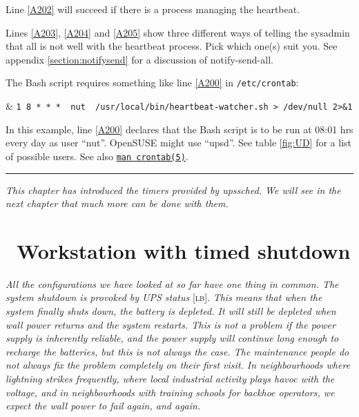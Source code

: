 \documentclass[12pt]{article}
\newlength{\headersep}\setlength{\headersep}{3mm}
\newcommand{\Hsep}{\hspace{\headersep}}
\newcommand{\newcolumn}{\vfill\eject}
\newcommand{\upssched}{\mbox{\textcolor{SCHEDCOLOUR}{upssched}}}
\newcommand{\notifysendall}{\mbox{\textcolor{NOTIFYCOLOUR}{notify-send-all}}}
\newcommand{\LB}{\textcolor{UPSDCOLOUR}{\textsc{lb}}}
\newcommand{\status}[1]{\textcolor{UPSDCOLOUR}{[{#1}]}}
\newcommand{\LINman}[2]{\href{https://man7.org/linux/man-pages/man#2/#1.#2.html}{\texttt{man #1(#2)}}}
\begin{document}
Line \ref{A202} will succeed if there is a process managing the heartbeat.

Lines \ref{A203}, \ref{A204} and \ref{A205} show three different ways
of telling the sysadmin that all is not well with the heartbeat
process.  Pick which one(s) suit you.  See appendix
\ref{section:notifysend} for a discussion of \notifysendall.

The Bash script requires something like line \ref{A200} in \texttt{/etc/crontab}:

\begin{LinePrinter}[0.99\LinePrinterwidth]
\Clunk[A200]  & \verb`1 8 * * *  nut  /usr/local/bin/heartbeat-watcher.sh > /dev/null 2>&1` \\
\end{LinePrinter}

In this example, line \ref{A200} declares that the Bash script is to
be run at 08:01 hrs every day as user ``nut''.  OpenSUSE might use
``upsd''.  See table \ref{fig:UD} for a list of possible users.  See
also \LINman{crontab}{5}.

\vspace*{\fill}
\begin{center}\rule{\LinePrinterwidth}{0.5mm}\end{center}
\vspace*{\fill}

\textsl{This chapter has introduced the timers provided by \upssched.
We will see in the next chapter that much more can be done with them.}

\vspace*{\fill}



\newcolumn
\section{\Hsep\ Workstation with timed shutdown}\label{section:bad}

\textsl{All the configurations we have looked at so far have one thing
  in common.  The system shutdown is provoked by UPS status}
\status{\LB}.  \textsl{This means that when the system finally shuts
  down, the battery is depleted.  It will still be depleted when wall
  power returns and the system restarts.  This is not a problem if the
  power supply is inherently reliable, and the power supply will
  continue long enough to recharge the batteries, but this is not
  always the case.  The maintenance people do not always fix the
  problem completely on their first visit. In neighbourhoods where
  lightning strikes frequently, where local industrial activity plays
  havoc with the voltage, and in neighbourhoods with training schools
  for backhoe operators, we expect the wall power to fail again, and
  again.}
\end{document}
